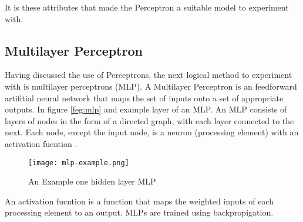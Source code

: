 \documentclass[bsc,frontabs,twoside,singlespacing,parskip,deptreport]{infthesis}     %
\begin{document}
It is these attributes that made the Perceptron a suitable model to experiment with.
\subsection{Multilayer Perceptron}
Having discussed the use of Perceptrons, the next logical method to experiment with is multilayer perceptrons (MLP).
A Multilayer Perceptron is an feedforward artifitial neural network that maps the set of inputs
onto a set of appropriate outputs.
In figure \ref{feg:mlp} and example layer of an MLP.
An MLP consists of layers of  nodes in the form of a directed graph, with each layer connected to the next.
Each node, except the input node, is a neuron (processing element) with an activation fucntion \cite{}.%

\begin{figure}
  \centering
  \texttt{[image: mlp-example.png]}
  \caption{An Example one hidden layer MLP \cite{scikit-learn}}
  \label{fig:mlp}
\end{figure}

An activation fucntion is a function that maps the weighted inputs of each processing element to an output.
MLPs are trained using backpropigation.
\end{document}
